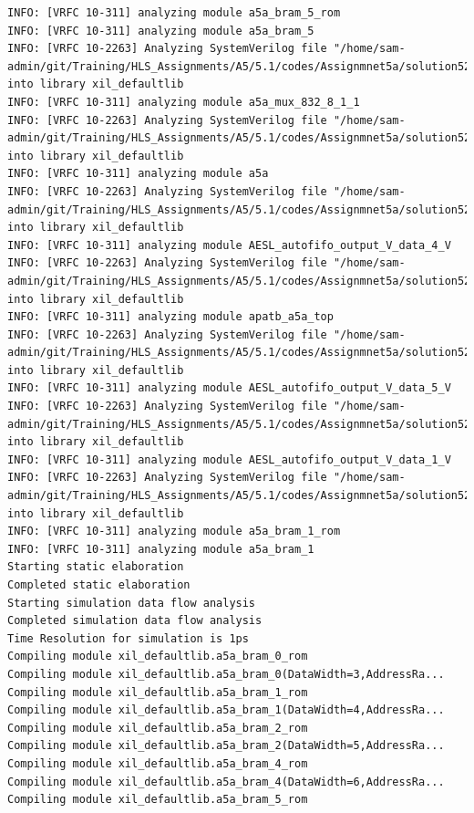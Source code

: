 \documentclass{article}
\begin{document}
\begin{lstlisting}
INFO: [VRFC 10-311] analyzing module a5a_bram_5_rom
INFO: [VRFC 10-311] analyzing module a5a_bram_5
INFO: [VRFC 10-2263] Analyzing SystemVerilog file "/home/sam-admin/git/Training/HLS_Assignments/A5/5.1/codes/Assignmnet5a/solution52a/sim/verilog/a5a_mux_832_8_1_1.v" into library xil_defaultlib
INFO: [VRFC 10-311] analyzing module a5a_mux_832_8_1_1
INFO: [VRFC 10-2263] Analyzing SystemVerilog file "/home/sam-admin/git/Training/HLS_Assignments/A5/5.1/codes/Assignmnet5a/solution52a/sim/verilog/a5a.v" into library xil_defaultlib
INFO: [VRFC 10-311] analyzing module a5a
INFO: [VRFC 10-2263] Analyzing SystemVerilog file "/home/sam-admin/git/Training/HLS_Assignments/A5/5.1/codes/Assignmnet5a/solution52a/sim/verilog/AESL_autofifo_output_V_data_4_V.v" into library xil_defaultlib
INFO: [VRFC 10-311] analyzing module AESL_autofifo_output_V_data_4_V
INFO: [VRFC 10-2263] Analyzing SystemVerilog file "/home/sam-admin/git/Training/HLS_Assignments/A5/5.1/codes/Assignmnet5a/solution52a/sim/verilog/a5a.autotb.v" into library xil_defaultlib
INFO: [VRFC 10-311] analyzing module apatb_a5a_top
INFO: [VRFC 10-2263] Analyzing SystemVerilog file "/home/sam-admin/git/Training/HLS_Assignments/A5/5.1/codes/Assignmnet5a/solution52a/sim/verilog/AESL_autofifo_output_V_data_5_V.v" into library xil_defaultlib
INFO: [VRFC 10-311] analyzing module AESL_autofifo_output_V_data_5_V
INFO: [VRFC 10-2263] Analyzing SystemVerilog file "/home/sam-admin/git/Training/HLS_Assignments/A5/5.1/codes/Assignmnet5a/solution52a/sim/verilog/AESL_autofifo_output_V_data_1_V.v" into library xil_defaultlib
INFO: [VRFC 10-311] analyzing module AESL_autofifo_output_V_data_1_V
INFO: [VRFC 10-2263] Analyzing SystemVerilog file "/home/sam-admin/git/Training/HLS_Assignments/A5/5.1/codes/Assignmnet5a/solution52a/sim/verilog/a5a_bram_1.v" into library xil_defaultlib
INFO: [VRFC 10-311] analyzing module a5a_bram_1_rom
INFO: [VRFC 10-311] analyzing module a5a_bram_1
Starting static elaboration
Completed static elaboration
Starting simulation data flow analysis
Completed simulation data flow analysis
Time Resolution for simulation is 1ps
Compiling module xil_defaultlib.a5a_bram_0_rom
Compiling module xil_defaultlib.a5a_bram_0(DataWidth=3,AddressRa...
Compiling module xil_defaultlib.a5a_bram_1_rom
Compiling module xil_defaultlib.a5a_bram_1(DataWidth=4,AddressRa...
Compiling module xil_defaultlib.a5a_bram_2_rom
Compiling module xil_defaultlib.a5a_bram_2(DataWidth=5,AddressRa...
Compiling module xil_defaultlib.a5a_bram_4_rom
Compiling module xil_defaultlib.a5a_bram_4(DataWidth=6,AddressRa...
Compiling module xil_defaultlib.a5a_bram_5_rom

\end{lstlisting}
\end{document}
